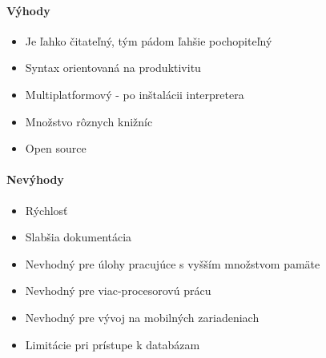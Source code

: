 \paragraph{Výhody}
\begin{itemize}
	\item Je ľahko čitateľný, tým pádom ľahšie pochopiteľný
	\item Syntax orientovaná na produktivitu
	\item Multiplatformový - po inštalácii interpretera
	\item Množstvo rôznych knižníc
	\item Open source
	\newline
\end{itemize}
\paragraph{Nevýhody}
\begin{itemize}
	\item Rýchlosť
	\item Slabšia dokumentácia
	\item Nevhodný pre úlohy pracujúce s vyšším množstvom pamäte
	\item Nevhodný pre viac-procesorovú prácu
	\item Nevhodný pre vývoj na mobilných zariadeniach
	\item Limitácie pri prístupe k databázam 
	\newline
\end{itemize}

